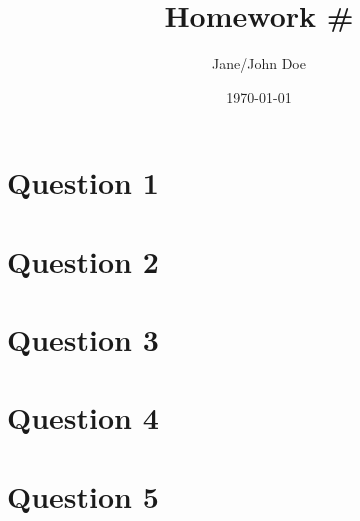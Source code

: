 \documentclass{report}
\title{Homework \#}
\author{Jane/John Doe}
\date{\today}
\begin{document}
\maketitle

\section*{Question 1}


\newpage

\section*{Question 2}

\newpage

\section*{Question 3}


\newpage

\section*{Question 4}


\newpage

\section*{Question 5}
\end{document}
